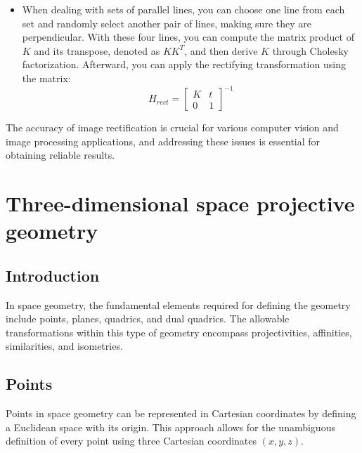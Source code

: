 \documentclass[12pt, a4paper]{report}
\begin{document}
\begin{enumerate}
\begin{itemize}
\begin{figure}[H]
                    \end{figure}
                \item When dealing with sets of parallel lines, you can choose one line from each set and randomly select another pair of lines, making sure they are perpendicular. 
                    With these four lines, you can compute the matrix product of $K$ and its transpose, denoted as $KK^T$, and then derive $K$ through Cholesky factorization.
                    Afterward, you can apply the rectifying transformation using the matrix:
                    \[H_{rect}=\begin{bmatrix}
                        K & t \\ 
                        0 & 1
                    \end{bmatrix}^{-1}\] 
            \end{itemize}
    \end{enumerate}
    The accuracy of image rectification is crucial for various computer vision and image processing applications, and addressing these issues is essential for obtaining reliable results.

\newpage

\chapter{Three-dimensional space projective geometry}
    \section{Introduction}
    In space geometry, the fundamental elements required for defining the geometry include points, planes, quadrics, and dual quadrics. 
    The allowable transformations within this type of geometry encompass projectivities, affinities, similarities, and isometries.

    \section{Points}
    Points in space geometry can be represented in Cartesian coordinates by defining a Euclidean space with its origin. 
    This approach allows for the unambiguous definition of every point using three Cartesian coordinates $(x, y, z)$.
\end{document}
